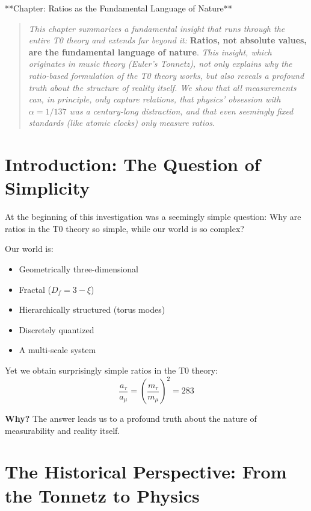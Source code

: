 **Chapter: Ratios as the Fundamental Language of Nature**
\label{chap:ratios_fundamental}

\begin{quote}
	\textit{This chapter summarizes a fundamental insight that runs through the entire T0 theory and extends far beyond it:} \textbf{Ratios, not absolute values, are the fundamental language of nature}. \textit{This insight, which originates in music theory (Euler's Tonnetz), not only explains why the ratio-based formulation of the T0 theory works, but also reveals a profound truth about the structure of reality itself. We show that all measurements can, in principle, only capture relations, that physics' obsession with $\alpha = 1/137$ was a century-long distraction, and that even seemingly fixed standards (like atomic clocks) only measure ratios.}
\end{quote}

\section{Introduction: The Question of Simplicity}

At the beginning of this investigation was a seemingly simple question: Why are ratios in the T0 theory so simple, while our world is so complex?

Our world is:
\begin{itemize}[nosep]
	\item Geometrically three-dimensional
	\item Fractal ($D_f = 3 - \xi$)
	\item Hierarchically structured (torus modes)
	\item Discretely quantized
	\item A multi-scale system
\end{itemize}

Yet we obtain surprisingly simple ratios in the T0 theory:
\begin{equation}
	\frac{a_\tau}{a_\mu} = \left(\frac{m_\tau}{m_\mu}\right)^2 = 283
	\label{eq:simple_ratio}
\end{equation}

\textbf{Why?} The answer leads us to a profound truth about the nature of measurability and reality itself.

\section{The Historical Perspective: From the Tonnetz to Physics}

